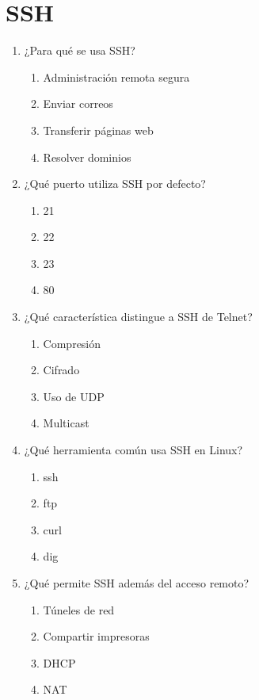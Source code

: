 \documentclass[12pt]{article}
\begin{document}
\section*{SSH}

\begin{enumerate}[label=\textbf{SSH-\arabic*.}]

\item ¿Para qué se usa SSH?
\begin{enumerate}[label=\alph*)]
\item Administración remota segura
\item Enviar correos
\item Transferir páginas web
\item Resolver dominios
\end{enumerate}

\item ¿Qué puerto utiliza SSH por defecto?
\begin{enumerate}[label=\alph*)]
\item 21
\item 22
\item 23
\item 80
\end{enumerate}

\item ¿Qué característica distingue a SSH de Telnet?
\begin{enumerate}[label=\alph*)]
\item Compresión
\item Cifrado
\item Uso de UDP
\item Multicast
\end{enumerate}

\item ¿Qué herramienta común usa SSH en Linux?
\begin{enumerate}[label=\alph*)]
\item ssh
\item ftp
\item curl
\item dig
\end{enumerate}

\item ¿Qué permite SSH además del acceso remoto?
\begin{enumerate}[label=\alph*)]
\item Túneles de red
\item Compartir impresoras
\item DHCP
\item NAT
\end{enumerate}

\end{enumerate}
\end{document}
